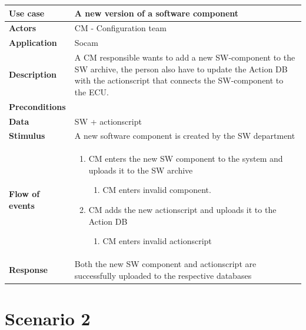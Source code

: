 	\begin{table}[H]
		\begin{tabular}{ p{4cm} | p{10cm} }
			\hline
			\rowcolor{gray}
			{\bf Use case} & {\bf A new version of a software component} \\ \hline
			{\bf Actors} & CM - Configuration team\\ \hline
			{\bf Application} & Socam \\ \hline
			{\bf Description} & A CM responsible wants to add a new SW-component to the 
			SW archive, the person also have to update the Action DB with the actionscript 
			that connects the SW-component to the ECU.\\ \hline
			{\bf Preconditions} & \\ \hline
			{\bf Data} & SW + actionscript \\ \hline
			{\bf Stimulus} & A new software component is created by the SW department \\ \hline
			{\bf Flow of events} & 

				\begin{enumerate}[font=\bfseries]
					\item CM enters the new SW component to the system and uploads it to the SW archive
					\begin{enumerate}[label*=\arabic*., font=\bfseries]
						\item CM enters invalid component. 
					\end{enumerate}
					
					\item CM adds the new actionscript and uploads it to the Action DB
					\begin{enumerate}[label*=\arabic*., font=\bfseries]
						\item CM enters invalid actionscript
					\end{enumerate}
				\end{enumerate}
			
			\\ \hline
			{\bf Response} & Both the new SW component and actionscript are 
			successfully uploaded to the respective databases \\ \hline

		\end{tabular}
	\end{table}

\section{Scenario 2}

